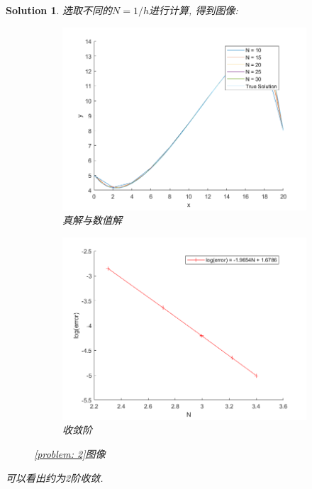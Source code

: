 \documentclass[a4paper, 12pt]{ctexart}
\theoremstyle{plain}
\theoremstyle{plain}
\theoremstyle{plain}
\theoremstyle{nonumberplain}
\newtheorem{solution}{Solution}
\begin{document}
\begin{solution}
        选取不同的$N=1/h$进行计算, 得到图像:
        \begin{figure}[H]
            \centering
            \begin{subfigure}[b]{0.45\textwidth}
                \centering
                \includegraphics[width=\textwidth]{wc21.png}
                \caption{真解与数值解}
            \end{subfigure}
            \hfill
            \begin{subfigure}[b]{0.45\textwidth}
                \centering
                \includegraphics[width=\textwidth]{wc22.png}
                \caption{收敛阶}
            \end{subfigure}
            \caption{\ref{problem: 2}图像}
       \end{figure}

       可以看出约为2阶收敛.
    \end{solution}
\end{document}
